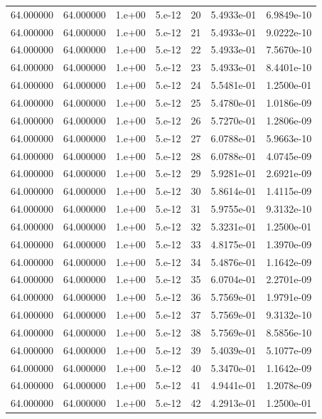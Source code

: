 \begin{table}[htbp]
\begin{tabular}{rrrrrrr}
64.000000 & 64.000000 & 1.e+00 & 5.e-12 & 20 & 5.4933e-01 & 6.9849e-10 \\
64.000000 & 64.000000 & 1.e+00 & 5.e-12 & 21 & 5.4933e-01 & 9.0222e-10 \\
64.000000 & 64.000000 & 1.e+00 & 5.e-12 & 22 & 5.4933e-01 & 7.5670e-10 \\
64.000000 & 64.000000 & 1.e+00 & 5.e-12 & 23 & 5.4933e-01 & 8.4401e-10 \\
64.000000 & 64.000000 & 1.e+00 & 5.e-12 & 24 & 5.5481e-01 & 1.2500e-01 \\
64.000000 & 64.000000 & 1.e+00 & 5.e-12 & 25 & 5.4780e-01 & 1.0186e-09 \\
64.000000 & 64.000000 & 1.e+00 & 5.e-12 & 26 & 5.7270e-01 & 1.2806e-09 \\
64.000000 & 64.000000 & 1.e+00 & 5.e-12 & 27 & 6.0788e-01 & 5.9663e-10 \\
64.000000 & 64.000000 & 1.e+00 & 5.e-12 & 28 & 6.0788e-01 & 4.0745e-09 \\
64.000000 & 64.000000 & 1.e+00 & 5.e-12 & 29 & 5.9281e-01 & 2.6921e-09 \\
64.000000 & 64.000000 & 1.e+00 & 5.e-12 & 30 & 5.8614e-01 & 1.4115e-09 \\
64.000000 & 64.000000 & 1.e+00 & 5.e-12 & 31 & 5.9755e-01 & 9.3132e-10 \\
64.000000 & 64.000000 & 1.e+00 & 5.e-12 & 32 & 5.3231e-01 & 1.2500e-01 \\
64.000000 & 64.000000 & 1.e+00 & 5.e-12 & 33 & 4.8175e-01 & 1.3970e-09 \\
64.000000 & 64.000000 & 1.e+00 & 5.e-12 & 34 & 5.4876e-01 & 1.1642e-09 \\
64.000000 & 64.000000 & 1.e+00 & 5.e-12 & 35 & 6.0704e-01 & 2.2701e-09 \\
64.000000 & 64.000000 & 1.e+00 & 5.e-12 & 36 & 5.7569e-01 & 1.9791e-09 \\
64.000000 & 64.000000 & 1.e+00 & 5.e-12 & 37 & 5.7569e-01 & 9.3132e-10 \\
64.000000 & 64.000000 & 1.e+00 & 5.e-12 & 38 & 5.7569e-01 & 8.5856e-10 \\
64.000000 & 64.000000 & 1.e+00 & 5.e-12 & 39 & 5.4039e-01 & 5.1077e-09 \\
64.000000 & 64.000000 & 1.e+00 & 5.e-12 & 40 & 5.3470e-01 & 1.1642e-09 \\
64.000000 & 64.000000 & 1.e+00 & 5.e-12 & 41 & 4.9441e-01 & 1.2078e-09 \\
64.000000 & 64.000000 & 1.e+00 & 5.e-12 & 42 & 4.2913e-01 & 1.2500e-01 \\

\end{tabular}
\end{table}

